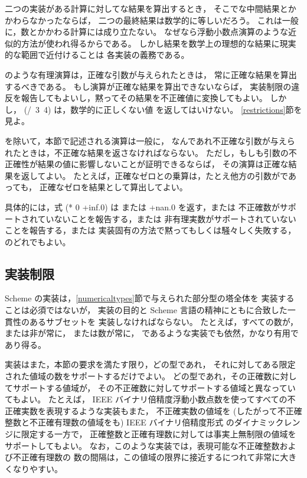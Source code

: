 \vest 二つの実装がある計算に対してな結果を算出するとき，
そこでな中間結果とかかわらなかったならば，
二つの最終結果は数学的に等しいだろう。
これは一般に，数とかかわる計算には成り立たない。
なぜなら浮動小数点演算のような近似的方法が使われ得るからである。
しかし結果を数学上の理想的な結果に現実的な範囲で近付けることは
各実装の義務である。

\vest {\cf +} のような有理演算は，正確な引数が与えられたときは，
常に正確な結果を算出するべきである。
もし演算が正確な結果を算出できないならば，
実装制限の違反を報告してもよいし，黙ってその結果を不正確値に変換してもよい。
しかし， {\cf (/~3~4)} は，数学的に正しくない値 {} を返してはいけない。
\ref{restrictions}節を見よ。

\vest {} を除いて，本節で記述される演算は一般に，
なんであれ不正確な引数が与えられたときは，不正確な結果を返さなければならない。
ただし，もしも引数の不正確性が結果の値に影響しないことが証明できるならば，
その演算は正確な結果を返してよい。
たとえば，正確なゼロとの乗算は，たとえ他方の引数がであっても，
正確なゼロを結果として算出してよい。

具体的には，式 {\cf (* 0 +inf.0)} は {} または {\cf +nan.0} を返す，または
不正確数がサポートされていないことを報告する，または
非有理実数がサポートされていないことを報告する，または
実装固有の方法で黙ってもしくは騒々しく失敗する，のどれでもよい。

\subsection{実装制限}

\label{restrictions}

\vest Scheme の実装は，\ref{numericaltypes}節で与えられた部分型の塔全体を
実装することは必須ではないが，
実装の目的と Scheme 言語の精神にともに合致した一貫性のあるサブセットを
実装しなければならない。
たとえば，すべての数が，
または非が常に，
または数が常に，
であるような実装でも依然，かなり有用であり得る。


\vest 実装はまた，本節の要求を満たす限り，どの型であれ，
それに対してある限定された値域の数をサポートするだけでよい。
どの型であれ，その正確数に対してサポートする値域が，
その不正確数に対してサポートする値域と異なっていてもよい。
たとえば， IEEE バイナリ倍精度浮動小数点数を使ってすべての不正確実数を表現するような実装もまた，
不正確実数の値域を (したがって不正確整数と不正確有理数の値域をも) IEEE バイナリ倍精度形式
のダイナミックレンジに限定する一方で，
正確整数と正確有理数に対しては事実上無制限の値域をサポートしてもよい。
なお，このような実装では，表現可能な不正確整数および不正確有理数の
数の間隔は，この値域の限界に接近するにつれて非常に大きくなりやすい。

